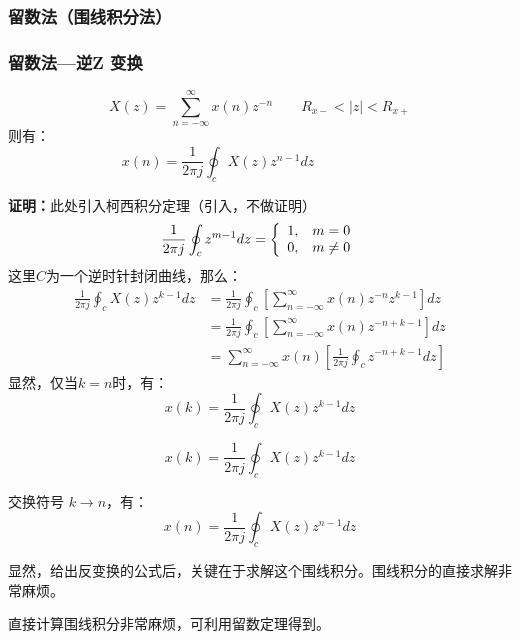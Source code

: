 \documentclass[notheorems,compress,mathserif,table]{beamer}
\begin{document}
\subsubsection*{留数法（围线积分法）}
\begin{frame}[allowframebreaks]\frametitle{留数法—逆Z 变换}%

$$X(z) = \sum_{n=-\infty}^{\infty}x(n)z^{-n}\quad\quad R_{x-} <|z|<R_{x+}$$
则有：
$$x(n) = \frac{1}{2\pi j}\oint_{c} X(z) z^{n-1}dz \quad\quad\quad\quad\quad\quad$$
\par   \textbf{证明：}此处引入柯西积分定理（引入，不做证明）
\begin{equation*}
\frac{1}{2\pi j}\oint_{c} z^{m-1}dz = \left\{
\begin{array}
{r@{,\quad}l}
1    & m   =  0 \\
0    & m \neq 0
\end{array} \right.
\end{equation*}
这里$C$为一个逆时针封闭曲线，那么：
\begin{equation*}
\begin{split}
\frac{1}{2\pi j}\oint_{c} X(z) z^{k-1}dz
&= \frac{1}{2\pi j}\oint_{c} \left[ \sum_{n=-\infty}^{\infty}x(n)z^{-n} z^{k-1}\right]dz \\
&= \frac{1}{2\pi j}\oint_{c} \left[  \sum_{n=-\infty}^{\infty}x(n)z^{-n+k-1}\right]dz \\
&= \sum_{n=-\infty}^{\infty}x(n)\left[\frac{1}{2\pi j}\oint_{c}  z^{-n+k-1}dz\right]   %
\end{split}
\end{equation*}
显然，仅当$k=n$时，有：
$$x(k) = \frac{1}{2\pi j}\oint_{c} X(z) z^{k-1}dz $$

\newpage
$$x(k) = \frac{1}{2\pi j}\oint_{c} X(z) z^{k-1}dz $$

交换符号 $k \rightarrow n$，有：\vspace{-0.3cm}
$$x(n) = \frac{1}{2\pi j}\oint_{c} X(z) z^{n-1}dz $$

显然，给出反变换的公式后，关键在于求解这个围线积分。围线积分的直接求解非常麻烦。\newline


\par 直接计算围线积分非常麻烦，可利用留数定理得到。

\end{frame}
\end{document}
